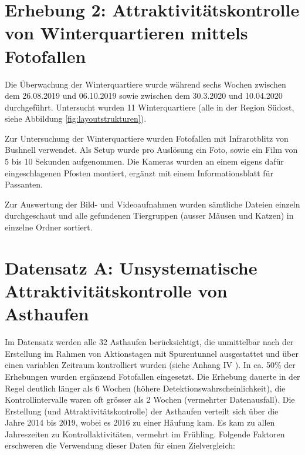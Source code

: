 \documentclass[
]{scrbook}
\begin{document}
\hypertarget{erhebung-2-attraktivituxe4tskontrolle-von-winterquartieren-mittels-fotofallen}{%
\section{Erhebung 2: Attraktivitätskontrolle von Winterquartieren mittels Fotofallen}\label{erhebung-2-attraktivituxe4tskontrolle-von-winterquartieren-mittels-fotofallen}}

Die Überwachung der Winterquartiere wurde während sechs Wochen zwischen dem 26.08.2019 und 06.10.2019 sowie zwischen dem 30.3.2020 und 10.04.2020 durchgeführt. Untersucht wurden 11 Winterquartiere (alle in der Region Südost, siehe Abbildung \ref{fig:layoutstrukturen}).

Zur Untersuchung der Winterquartiere wurden Fotofallen mit Infrarotblitz von Bushnell verwendet. Als Setup wurde pro Auslösung ein Foto, sowie ein Film von 5 bis 10 Sekunden aufgenommen. Die Kameras wurden an einem eigens dafür eingeschlagenen Pfosten montiert, ergänzt mit einem Informationsblatt für Passanten.

Zur Auswertung der Bild- und Videoaufnahmen wurden sämtliche Dateien einzeln durchgeschaut und alle gefundenen Tiergruppen (ausser Mäusen und Katzen) in einzelne Ordner sortiert.

\hypertarget{datensatz-a-unsystematische-attraktivituxe4tskontrolle-von-asthaufen}{%
\section{Datensatz A: Unsystematische Attraktivitätskontrolle von Asthaufen}\label{datensatz-a-unsystematische-attraktivituxe4tskontrolle-von-asthaufen}}

Im Datensatz werden alle 32 Asthaufen berücksichtigt, die unmittelbar nach der Erstellung im Rahmen von Aktionstagen mit Spurentunnel ausgestattet und über einen variablen Zeitraum kontrolliert wurden (siehe Anhang IV ). In ca. 50\% der Erhebungen wurden ergänzend Fotofallen eingesetzt. Die Erhebung dauerte in der Regel deutlich länger als 6 Wochen (höhere Detektionswahrscheinlichkeit), die Kontrollintervalle waren oft grösser als 2 Wochen (vermehrter Datenausfall). Die Erstellung (und Attraktivitätskontrolle) der Asthaufen verteilt sich über die Jahre 2014 bis 2019, wobei es 2016 zu einer Häufung kam. Es kam zu allen Jahreszeiten zu Kontrollaktivitäten, vermehrt im Frühling. Folgende Faktoren erschweren die Verwendung dieser Daten für einen Zielvergleich:
\end{document}
